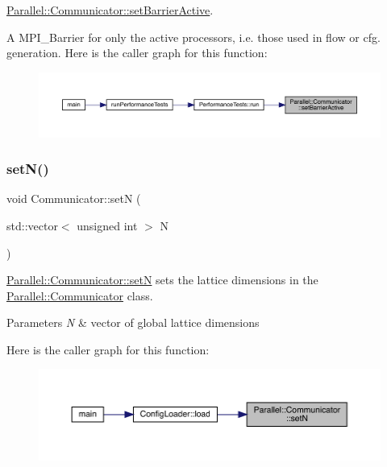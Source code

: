 \mbox{\hyperlink{class_parallel_1_1_communicator_af61a4b8a49509982ae96d2a99dfb9f49}{Parallel\+::\+Communicator\+::set\+Barrier\+Active}}. 

A M\+P\+I\+\_\+\+Barrier for only the active processors, i.\+e. those used in flow or cfg. generation. Here is the caller graph for this function\+:
\nopagebreak
\begin{figure}[H]
\begin{center}
\leavevmode
\includegraphics[width=350pt]{class_parallel_1_1_communicator_af61a4b8a49509982ae96d2a99dfb9f49_icgraph}
\end{center}
\end{figure}
\mbox{\label{class_parallel_1_1_communicator_a1db417babab93c8d8bf6339ff2bab540}} 
\subsubsection{\texorpdfstring{setN()}{setN()}}
{\footnotesize\ttfamily void Communicator\+::setN (\begin{DoxyParamCaption}\item[{std\+::vector$<$ unsigned int $>$}]{N }\end{DoxyParamCaption})\hspace{0.3cm}{\ttfamily [static]}}



\mbox{\hyperlink{class_parallel_1_1_communicator_a1db417babab93c8d8bf6339ff2bab540}{Parallel\+::\+Communicator\+::setN}} sets the lattice dimensions in the \mbox{\hyperlink{class_parallel_1_1_communicator}{Parallel\+::\+Communicator}} class. 


\begin{DoxyParams}{Parameters}
{\em N} & vector of global lattice dimensions \\
\hline
\end{DoxyParams}
Here is the caller graph for this function\+:
\nopagebreak
\begin{figure}[H]
\begin{center}
\leavevmode
\includegraphics[width=350pt]{class_parallel_1_1_communicator_a1db417babab93c8d8bf6339ff2bab540_icgraph}
\end{center}
\end{figure}


